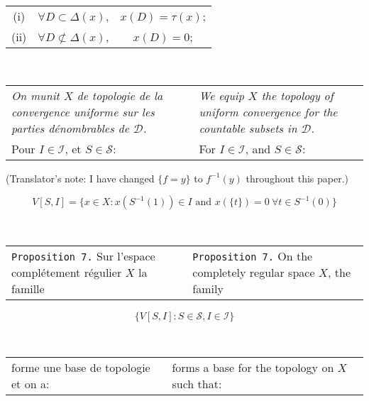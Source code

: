 \documentclass[12pt]{article}
\theoremstyle{plain}
\theoremstyle{definition}
\theoremstyle{remark}
\begin{document}
\begin{center}
\begin{tabular}{ccc}
(i) & $\forall D \subset \Delta(x)$, & $x(D) = \tau(x)$; \\
(ii) & $\forall D \not\subset \Delta(x)$, & $x(D) = 0$;
\end{tabular}
\end{center}

\

\begin{tabular}{p{2.8in} p{2.8in}}
\textit{On munit $X$ de topologie de la convergence uniforme sur les parties d\'enombrables de $\mathcal{D}$.}

&

\textit{We equip $X$ the topology of uniform convergence for the countable subsets in $\mathcal{D}$.}

\\

Pour $I \in \mathcal{I}$, et $S \in \mathcal{S}$:

&

For $I \in \mathcal{I}$, and $S \in \mathcal{S}$:

\end{tabular}

\centerline{(Translator's note: I have changed $\{f=y\}$ to $f^{-1}(y)$ throughout this paper.) }\[V[S,I] = \{x \in X: x(S^{-1}(1)) \in I \text{ and } x(\{t\}) = 0 \ \forall t \in S^{-1}(0) \}\]

\

\begin{tabular}{p{2.8in} p{2.8in}}

\texttt{Proposition 7.} Sur l'espace compl\'etement r\'egulier $X$ la famille

&

\texttt{Proposition 7.} On the completely regular space $X$, the family

\end{tabular}

\[\{V[S,I] : S \in \mathcal{S}, I \in \mathcal{I}\}\]

\

\begin{tabular}{p{2.8in} p{2.8in}}

forme une base de topologie et on a: 

&

forms a base for the topology on $X$ such that:

\end{tabular}
\end{document}
